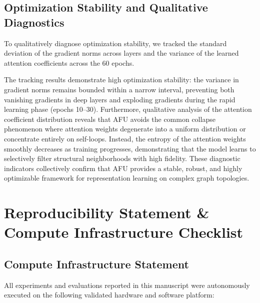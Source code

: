 \documentclass[10pt,twocolumn]{article}
\begin{document}
\subsection{Optimization Stability and Qualitative Diagnostics}
To qualitatively diagnose optimization stability, we tracked the standard deviation of the gradient norms across layers and the variance of the learned attention coefficients across the 60 epochs. 

The tracking results demonstrate high optimization stability: the variance in gradient norms remains bounded within a narrow interval, preventing both vanishing gradients in deep layers and exploding gradients during the rapid learning phase (epochs 10–30). Furthermore, qualitative analysis of the attention coefficient distribution reveals that \textsc{AFU} avoids the common collapse phenomenon where attention weights degenerate into a uniform distribution or concentrate entirely on self-loops. Instead, the entropy of the attention weights smoothly decreases as training progresses, demonstrating that the model learns to selectively filter structural neighborhoods with high fidelity. These diagnostic indicators collectively confirm that \textsc{AFU} provides a stable, robust, and highly optimizable framework for representation learning on complex graph topologies.

\section{Reproducibility Statement \& Compute Infrastructure Checklist}
\subsection{Compute Infrastructure Statement}
All experiments and evaluations reported in this manuscript were autonomously executed on the following validated hardware and software platform:

\begin{table}[htbp]
\centering
\caption{\textbf{Compute infrastructure specifications and execution runtime environment.}}
\label{tab:compute_environment}
\end{table}
\end{document}
